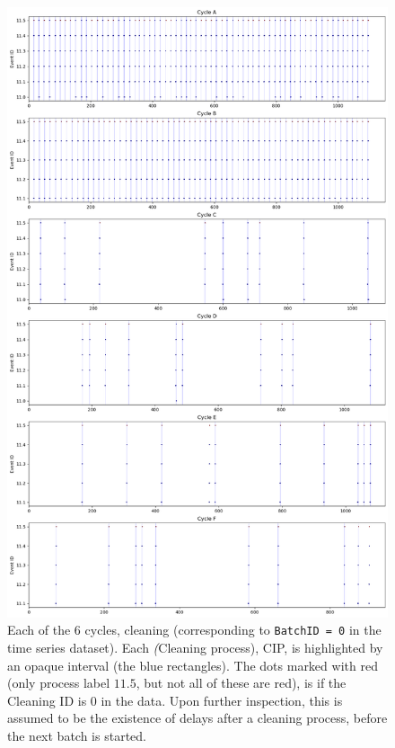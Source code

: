 \documentclass[../Thesis.tex]{subfiles}
\begin{document}
\newpage
\begin{figure}[H]
    \centering
    \includegraphics[width=0.9\linewidth]{figures/Multiple cycles data/Cleaning batches.png}
    \caption{Each of the 6 cycles, cleaning (corresponding to \texttt{BatchID = 0} in the time series dataset). Each \textit(Cleaning process), CIP, is highlighted by an opaque interval (the blue rectangles). The dots marked with red (only process label $11.5$, but not all of these are red), is if the Cleaning ID is 0 in the data. Upon further inspection, this is assumed to be the existence of delays after a cleaning process, before the next batch is started.}
    \label{fig:cycle cleaning time series}
\end{figure}
\end{document}
